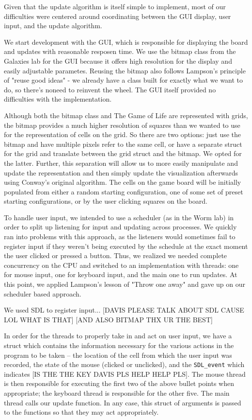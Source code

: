 \documentclass[12pt]{article}
\begin{document}
	Given that the update algorithm is itself simple to implement, most of our difficulties were centered around coordinating between the GUI display, user input, and the update algorithm.	
	
	We start development with the GUI, which is responsible for displaying the board and updates with reasonable resposen time. We use the bitmap class from the Galaxies lab for the GUI because it offers high resolution for the display and easily adjustable parametes. Reusing the bitmap also follows Lampson's principle of "reuse good ideas" - we already have a class built for exactly what we want to do, so there's noneed to reinvent the wheel. The GUI itself provided no difficulties with the implementation. 
	
	Although both the bitmap class and The Game of Life are represented with grids, the bitmap provides a much higher resolution of squares than we wanted to use for the representation of cells on the grid. So there are two options: just use the bitmap and have multiple pixels refer to the same cell, or have a separate struct for the grid and translate between the grid struct and the bitmap. We opted for the latter. Further, this separation will allow us to more easily manipulate and update the representation and then simply update the visualization afterwards using Conway's original algorithm. The cells on the game board will be initially populated from either a random starting configuration, one of some set of preset starting configurations, or by the user clicking squares on the board. 
	
	To handle user input, we intended to use a scheduler (as in the Worm lab) in order to split up listening for input and updating across processes. We quickly ran into problems with this approach, as the listeners would sometimes fail to register input if they weren't being executed by the schedule at the exact moment the user clicked or pressed a button. Thus, we realized we needed complete concurrency on the CPU and switched to an implementation with threads: one for mouse input, one for keyboard input, and the main one to run updates. At this point, we applied Lampson's lesson of "Throw one away" and gave up on our scheduler based approach.
	
	We used SDL to register input... [DAVIS PLEASE TALK ABOUT SDL CAUSE LOL WHAT IS THAT] [AND ALSO BITMAP THX UR THE BEST]
	
	In order for the threads to properly take in and act on user input, we have a struct which contains the information necessary for the various actions in the program to be taken -- the location of the cell from which the user input was recorded, the state of the mouse (clicked or unclicked), and the \texttt{SDL\_event} which indicates [IS THE THE KEY DAVIS PLS HELP HELP PLS]. The mouse thread is then responsible for executing the first two of the above bullet points when appropriate; the keyboard thread is responsible for the other five. The main thread calls our update function. In any case, this struct of arguments is passed to the functions so that they may act appropriately. 
	
\end{document}
